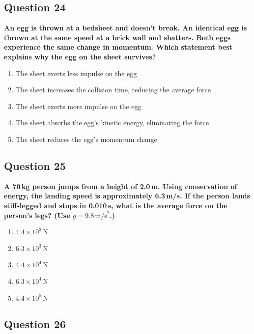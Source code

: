 \documentclass[12pt,letterpaper]{article}
\begin{document}
\subsection{Question 24}

\begin{questionbox}
\textbf{An egg is thrown at a bedsheet and doesn't break. An identical egg is thrown at the same speed at a brick wall and shatters. Both eggs experience the same change in momentum. Which statement best explains why the egg on the sheet survives?}

\begin{enumerate}[label=\alph*)]
    \item The sheet exerts less impulse on the egg
    \item The sheet increases the collision time, reducing the average force
    \item The sheet exerts more impulse on the egg
    \item The sheet absorbs the egg's kinetic energy, eliminating the force
    \item The sheet reduces the egg's momentum change
\end{enumerate}
\end{questionbox}

\subsection{Question 25}

\begin{questionbox}
\textbf{A 70\,kg person jumps from a height of 2.0\,m. Using conservation of energy, the landing speed is approximately 6.3\,m/s. If the person lands stiff-legged and stops in 0.010\,s, what is the average force on the person's legs? (Use $g = 9.8\,\text{m/s}^2$.)}

\begin{enumerate}[label=\alph*)]
    \item $4.4 \times 10^3\,\text{N}$
    \item $6.3 \times 10^3\,\text{N}$
    \item $4.4 \times 10^4\,\text{N}$
    \item $6.3 \times 10^4\,\text{N}$
    \item $4.4 \times 10^5\,\text{N}$
\end{enumerate}
\end{questionbox}

\subsection{Question 26}
\end{document}
